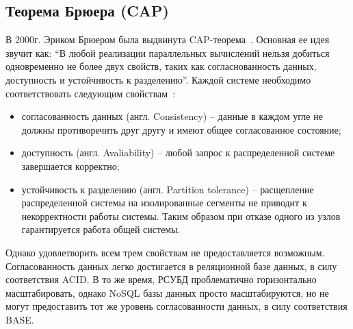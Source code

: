\clearpage

\subsection{Теорема Брюера (CAP)}
В 2000г. Эриком Брюером была выдвинута CAP-теорема~\cite{cap,cap_new}. 
Основная ее идея звучит как: ``В любой реализации параллельных вычислений нельзя добиться одновременно не более двух свойств, таких как согласнованность данных, доступность и устойчивость к разделению''.
Каждой системе необходимо соответствовать следующим свойствам~\cite{morecap}:
\begin{itemize}[label=---]
    \item согласованность данных (англ. Consistency) -- данные в каждом угле не должны противоречить друг другу и имеют общее согласованное состояние;
    \item доступность (англ. Avaliability) -- любой запрос к распределенной системе завершается корректно;
    \item устойчивость к разделению (англ. Partition tolerance) -- расщепление распределенной системы на изолированные сегменты не приводит к некорректности работы системы. Таким образом при отказе одного из узлов гарантируется работа общей системы.
\end{itemize}

Однако удовлетворить всем трем свойствам не предоставляется возможным.
Согласованность данных легко достигается в реляционной базе данных, в силу соответствия ACID.
В то же время, РСУБД проблематично горизонтально масштабировать,
однако NoSQL базы данных просто масштабируются,
но не могут предоставить тот же уровень согласованности данных,
в силу соответствия BASE.

\clearpage
